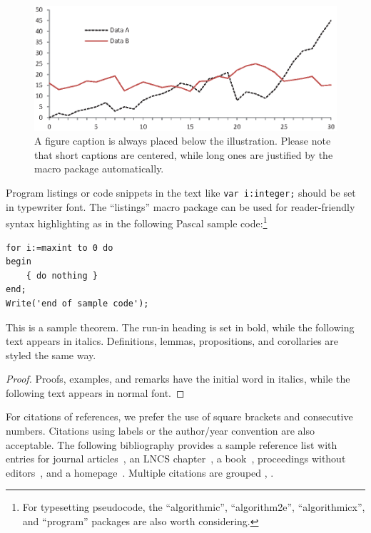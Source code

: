 \documentclass[runningheads]{llncs}
\begin{document}
\begin{figure}
\includegraphics[width=\textwidth]{fig1.eps}
\caption{A figure caption is always placed below the illustration.
Please note that short captions are centered, while long ones are
justified by the macro package automatically.} \label{fig1}
\end{figure}

Program listings or code snippets in the text like \lstinline!var i:integer;!
should be set in typewriter font. The ``listings'' macro package can be used
for reader-friendly syntax highlighting as in the following Pascal sample code:\footnote{For
typesetting pseudocode, the ``algorithmic'', ``algorithm2e'', ``algorithmicx'',
and ``program'' packages are also worth considering.}
\begin{lstlisting}
for i:=maxint to 0 do
begin
    { do nothing }
end;
Write('end of sample code');
\end{lstlisting}


\begin{theorem}
This is a sample theorem. The run-in heading is set in bold, while
the following text appears in italics. Definitions, lemmas,
propositions, and corollaries are styled the same way.
\end{theorem}
%
%
\begin{proof}
Proofs, examples, and remarks have the initial word in italics,
while the following text appears in normal font.
\end{proof}
For citations of references, we prefer the use of square brackets
and consecutive numbers. Citations using labels or the author/year
convention are also acceptable. The following bibliography provides
a sample reference list with entries for journal
articles~\cite{ref_article1}, an LNCS chapter~\cite{ref_lncs1}, a
book~\cite{ref_book1}, proceedings without editors~\cite{ref_proc1},
and a homepage~\cite{ref_url1}. Multiple citations are grouped
\cite{ref_article1,ref_lncs1,ref_book1},
\cite{ref_article1,ref_book1,ref_proc1,ref_url1}.
\end{document}
